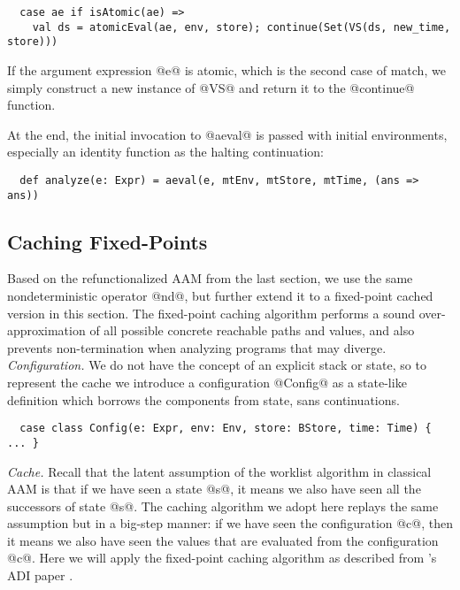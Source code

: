 \documentclass[acmsmall, review]{acmart}\settopmatter{}
\begin{document}
\begin{lstlisting}
  case ae if isAtomic(ae) => 
    val ds = atomicEval(ae, env, store); continue(Set(VS(ds, new_time, store)))
\end{lstlisting}

If the argument expression @e@ is atomic, which is the second case of match, we simply 
construct a new instance of @VS@ and return it to the @continue@ function.

At the end, the initial invocation to @aeval@ is passed with initial environments,
especially an identity function as the halting continuation:
\begin{lstlisting}
  def analyze(e: Expr) = aeval(e, mtEnv, mtStore, mtTime, (ans => ans))
\end{lstlisting}

\subsection{Caching Fixed-Points}

Based on the refunctionalized AAM from the last section, we use the same nondeterministic
operator @nd@, but further extend it to a fixed-point cached version in this section.
The fixed-point caching algorithm performs a sound over-approximation of all possible
concrete reachable paths and values, and also prevents non-termination when analyzing 
programs that may diverge. \\

\textit{Configuration.}
We do not have the concept of an explicit stack or state, so to represent the cache 
we introduce a configuration @Config@ as a state-like definition which borrows the 
components from state, sans continuations.

\begin{lstlisting}
  case class Config(e: Expr, env: Env, store: BStore, time: Time) { ... }
\end{lstlisting}

\textit{Cache.}
Recall that the latent assumption of the worklist algorithm in classical AAM is that 
if we have seen a state @s@, it means we also have seen all the successors of state @s@.
The caching algorithm we adopt here replays the same assumption but in a big-step 
manner: if we have seen the configuration @c@, then it means we also have seen the 
values that are evaluated from the configuration @c@.
Here we will apply the fixed-point caching algorithm as described from
\citeauthor{darais2017abstracting}'s ADI paper \cite{darais2017abstracting}.
\end{document}
